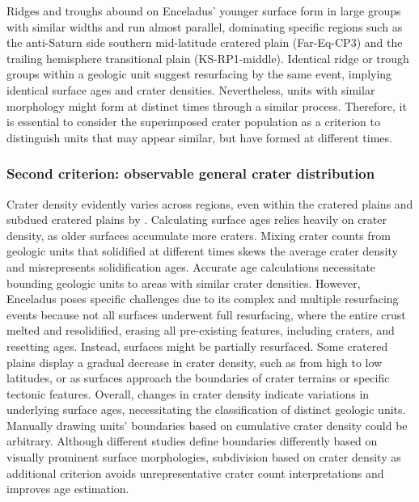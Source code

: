 \documentclass[preprint,12pt,3p,times,authoryear]{elsarticle}
\begin{document}
Ridges and troughs abound on Enceladus’ younger surface form in large groups with similar widths and run almost parallel, dominating specific regions such as the anti-Saturn side southern mid-latitude cratered plain (Far-Eq-CP3) and the trailing hemisphere transitional plain (KS-RP1-middle). Identical ridge or trough groups within a geologic unit suggest resurfacing by the same event, implying identical surface ages and crater densities. Nevertheless, units with similar morphology might form at distinct times through a similar process. Therefore, it is essential to consider the superimposed crater population as a criterion to distinguish units that may appear similar, but have formed at different times.

\subsubsection{Second criterion: observable general crater distribution}
Crater density evidently varies across regions, even within the cratered plains and subdued cratered plains by \citet{CrowWillard2015}. Calculating surface ages relies heavily on crater density, as older surfaces accumulate more craters. Mixing crater counts from geologic units that solidified at different times skews the average crater density and misrepresents solidification ages. Accurate age calculations necessitate bounding geologic units to areas with similar crater densities. However, Enceladus poses specific challenges due to its complex and multiple resurfacing events because not all surfaces underwent full resurfacing, where the entire crust melted and resolidified, erasing all pre-existing features, including craters, and resetting ages. Instead, surfaces might be partially resurfaced. Some cratered plains display a gradual decrease in crater density, such as from high to low latitudes, or as surfaces approach the boundaries of crater terrains or specific tectonic features. Overall, changes in crater density indicate variations in underlying surface ages, necessitating the classification of distinct geologic units.\\

Manually drawing units’ boundaries based on cumulative crater density could be arbitrary. Although different studies define boundaries differently based on visually prominent surface morphologies, subdivision based on crater density as additional criterion avoids unrepresentative crater count interpretations and improves age estimation.
\end{document}
